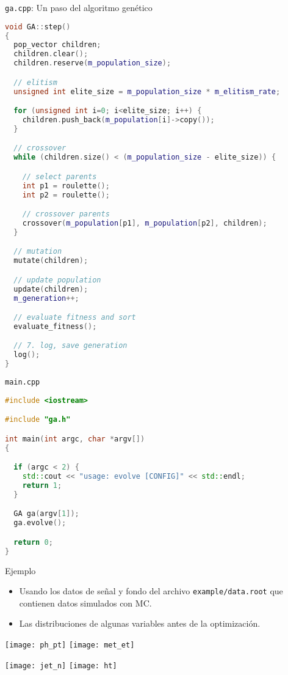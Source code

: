 \documentclass[center,10pt,cm]{beamer}
\begin{document}
\begin{frame}[fragile]{\texttt{ga.cpp}: Un paso del algoritmo gen\'etico}

  \begin{lstlisting}[language=c++]
void GA::step()
{
  pop_vector children;
  children.clear();
  children.reserve(m_population_size);

  // elitism
  unsigned int elite_size = m_population_size * m_elitism_rate;

  for (unsigned int i=0; i<elite_size; i++) {
    children.push_back(m_population[i]->copy());
  }

  // crossover
  while (children.size() < (m_population_size - elite_size)) {

    // select parents
    int p1 = roulette();
    int p2 = roulette();

    // crossover parents
    crossover(m_population[p1], m_population[p2], children);
  }

  // mutation
  mutate(children);

  // update population
  update(children);
  m_generation++;

  // evaluate fitness and sort
  evaluate_fitness();

  // 7. log, save generation
  log();
}
\end{lstlisting}
\end{frame}

\begin{frame}[fragile]{\texttt{main.cpp}}

  \begin{lstlisting}[language=c++]
#include <iostream>

#include "ga.h"

int main(int argc, char *argv[])
{

  if (argc < 2) {
    std::cout << "usage: evolve [CONFIG]" << std::endl;
    return 1;
  }

  GA ga(argv[1]);
  ga.evolve();

  return 0;
}
  \end{lstlisting}
\end{frame}

\begin{frame}[fragile]{Ejemplo}

  \begin{itemize}
  \item Usando los datos de se\~nal y fondo del archivo \texttt{example/data.root} que contienen datos simulados con MC.
  \item Las distribuciones de algunas variables antes de la optimizaci\'on.
  \end{itemize}

  \texttt{[image: ph\_pt]}
  \texttt{[image: met\_et]}

  \texttt{[image: jet\_n]}
  \texttt{[image: ht]}

\end{frame}
\end{document}
